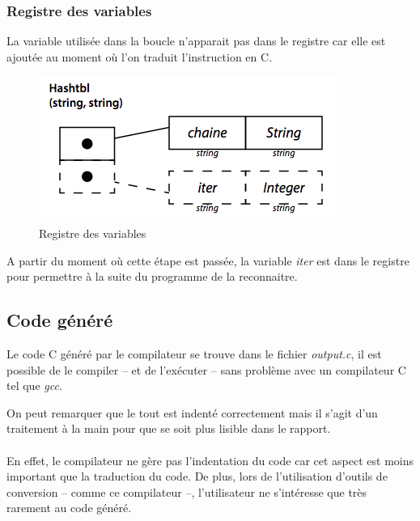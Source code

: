 \documentclass{article}
\begin{document}
\subsubsection*{Registre des variables}
La variable utilisée dans la boucle n'apparait pas dans le registre car elle est ajoutée
au moment où l'on traduit l'instruction en C. 

\begin{figure}[h]
    \centering
    \includegraphics[scale=0.6]{resources/registre.png}
    \caption{Registre des variables}
\end{figure}

A partir du moment où cette étape est passée, 
la variable \emph{iter} est dans le registre pour permettre à la suite du programme de la
reconnaitre.

\subsection{Code généré}
Le code C généré par le compilateur se trouve dans le fichier \emph{output.c}, il est 
possible de le compiler -- et de l'exécuter -- sans problème avec un compilateur C tel que \emph{gcc}.

\lstset{language=c,caption=Code c de l'exemple}


On peut remarquer que le tout est indenté correctement mais il s'agit d'un traitement à la main 
pour que se soit plus lisible dans le rapport. 
\\\\
En effet, le compilateur ne gère pas 
l'indentation du code car cet aspect est moins important que la traduction du code. De plus,
lors de l'utilisation d'outils de conversion -- comme ce compilateur --, l'utilisateur ne 
s'intéresse que très rarement au code généré.
\end{document}
